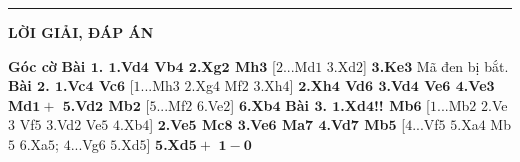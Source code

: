 \vspace*{-10pt}
\rule{1\linewidth}{0.1pt}
\begin{center}
	\textbf{\Large\color{gocco}LỜI GIẢI, ĐÁP ÁN}
\end{center}
\begin{multicols}{2}
	\textbf{\color{gocco}Góc cờ}
	\vskip 0.1cm
	\textbf{\color{gocco}Bài $\pmb{1}$.
				$\pmb{1}$.Vd$\pmb{4}$ Vb$\pmb{4}$ $\pmb{2}$.Xg$\pmb{2}$ Mh$\pmb{3}$} [$2$...Md$1$ $3$.Xd$2$]
	\vskip 0.1cm
	\textbf{\color{gocco}$\pmb{3}$.Ke$\pmb{3}$} Mã đen bị bắt.
	\vskip 0.1cm
	\textbf{\color{gocco}Bài $\pmb{2}$. 
				$\pmb{1}$.Vc$\pmb{4}$ Vc$\pmb{6}$} [$1$...Mh$3$ $2$.Xg$4$ Mf$2$ $3$.Xh$4$]
	\vskip 0.1cm
	\textbf{\color{gocco}$\pmb{2}$.Xh$\pmb{4}$ Vd$\pmb{6}$ $\pmb{3}$.Vd$\pmb{4}$ Ve$\pmb{6}$ $\pmb{4}$.Ve$\pmb{3}$ Md$\pmb{1+}$ $\pmb{5}$.Vd$\pmb{2}$ Mb$\pmb{2}$} [$5$...Mf$2$ $6$.Ve$2$]
	\vskip 0.1cm
	\textbf{\color{gocco}$\pmb{6}$.Xb$\pmb{4}$}
	\vskip 0.1cm
	\textbf{\color{gocco}Bài $\pmb{3}$.
				$\pmb{1}$.Xd$\pmb{4}$!! Mb$\pmb{6}$} [$1$...Mb$2$ $2$.Ve$3$ Vf$5$ $3$.Vd$2$ Ve$5$ $4$.Xb$4$]
	\vskip 0.1cm
	\textbf{\color{gocco}$\pmb{2}$.Ve$\pmb{5}$ Mc$\pmb{8}$ $\pmb{3}$.Ve$\pmb{6}$ Ma$\pmb{7}$ $\pmb{4}$.Vd$\pmb{7}$ Mb$\pmb{5}$} [$4$...Vf$5$ $5$.Xa$4$ Mb$5$ $6$.Xa$5$; $4$...Vg$6$ $5$.Xd$5$]
	\vskip 0.1cm
	\textbf{\color{gocco}$\pmb{5}$.Xd$\pmb{5+}$}
	\vskip 0.1cm
	$\pmb{1-0}$
\end{multicols}



